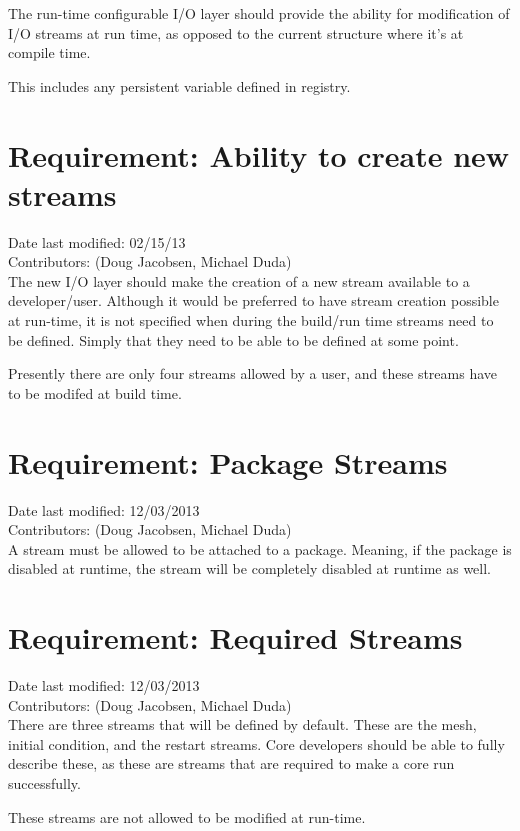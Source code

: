 \documentclass[11pt]{report}
\begin{document}
The run-time configurable I/O layer should provide the ability for modification
of I/O streams at run time, as opposed to the current structure where it's at
compile time.

This includes any persistent variable defined in registry.

\section{Requirement: Ability to create new streams}
Date last modified: 02/15/13 \\
Contributors: (Doug Jacobsen, Michael Duda) \\

The new I/O layer should make the creation of a new stream available to a
developer/user. Although it would be preferred to have stream creation possible
at run-time, it is not specified when during the build/run time streams need to
be defined. Simply that they need to be able to be defined at some point.

Presently there are only four streams allowed by a user, and these streams have
to be modifed at build time.

\section{Requirement: Package Streams}
Date last modified: 12/03/2013 \\
Contributors: (Doug Jacobsen, Michael Duda) \\

A stream must be allowed to be attached to a package. Meaning, if the package is disabled at runtime, the stream will be completely disabled at runtime as well.

\section{Requirement: Required Streams}
Date last modified: 12/03/2013 \\
Contributors: (Doug Jacobsen, Michael Duda) \\

There are three streams that will be defined by default. These are the mesh,
initial condition, and the restart streams. Core developers should be able to
fully describe these, as these are streams that are required to make a core run
successfully.

These streams are not allowed to be modified at run-time.
\end{document}
